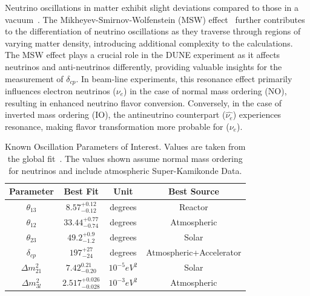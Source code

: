 Neutrino oscillations in matter exhibit slight deviations compared to those in a vacuum~\citep{PhysRevD.17.2369}.
The Mikheyev-Smirnov-Wolfenstein (MSW) effect~\citep{Smirnov2004TheME} further contributes to the differentiation of neutrino oscillations as they traverse through regions of varying matter density, introducing additional complexity to the calculations.
The MSW effect plays a crucial role in the DUNE experiment as it affects neutrinos and anti-neutrinos differently, providing valuable insights for the measurement of $\delta_{cp}$.
In beam-line experiments, this resonance effect primarily influences electron neutrinos ($\nu_{e}$) in the case of normal mass ordering (NO), resulting in enhanced neutrino flavor conversion.
Conversely, in the case of inverted mass ordering (IO), the antineutrino counterpart ($\hat{\nu_{e}}$) experiences resonance, making flavor transformation more probable for ($\nu_{e}$).
\begin{table}
\begin{center}
\begin{tabular}{||c c c c||}
 \hline
 Parameter & Best Fit & Unit & Best Source\\ [0.5ex]
 \hline\hline
  $\theta_{13}$ & $8.57^{+0.12}_{-0.12}$ & degrees & Reactor \\ %
 \hline
  $\theta_{12}$ & $33.44^{+0.77}_{-0.74}$ & degrees & Atmospheric \\ %
 \hline
  $\theta_{23}$ & $49.2^{+0.9}_{-1.2}$ & degrees & Solar \\ %
 \hline
  $\delta_{cp}$ & $197^{+27}_{-24}$ & degrees & Atmospheric+Accelerator \\ %
 \hline
  $\Delta m_{21}^{2}$ & $7.42^{0.21}_{-0.20}$ & $10^{-5}eV^{2}$ & Solar \\ %
 \hline
  $\Delta m_{3l}^{2}$ & $2.517^{+0.026}_{-0.028}$ & $10^{-3}eV^{2}$ & Atmospheric  \\
 \hline
\end{tabular}
\caption{Known Oscillation Parameters of Interest.
Values are taken from the global fit~\citep{2020JHEP...09..178E}.
The values shown assume normal mass ordering for neutrinos and include atmospheric Super-Kamikonde Data.
}
\label{table:pmns_params}
\end{center}
\end{table}

